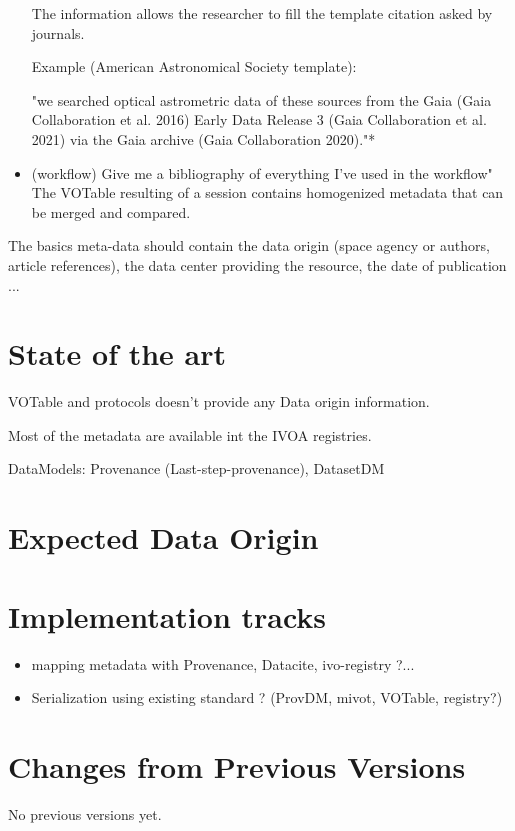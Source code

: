 \documentclass[11pt,a4paper]{ivoa}
\begin{document}
\begin{itemize}
	The information allows the researcher to fill the template citation asked by journals.
	
	Example (American Astronomical Society template):
	
	"we searched optical astrometric data of these sources from the Gaia (Gaia Collaboration et al. 2016) Early Data Release 3 (Gaia Collaboration et al. 2021) via the Gaia archive (Gaia Collaboration 2020)."*
	
	\item (workflow) Give me a bibliography of everything I've used in the workflow"
	The VOTable resulting of a session contains homogenized metadata that can be merged and compared.
	
\end{itemize}

The basics meta-data should contain the data origin (space agency or authors, article references), the data center providing the resource, the date of publication ...

\section{State of the art}
VOTable and protocols doesn't provide any Data origin information.

Most of the metadata are available int the IVOA registries.

DataModels:  Provenance (Last-step-provenance), DatasetDM 


\section{Expected Data Origin}

\section{Implementation tracks}

\begin{itemize}
\item mapping metadata with Provenance, Datacite, ivo-registry ?...
\item Serialization using existing standard ? (ProvDM, mivot, VOTable, registry?)
\end{itemize}

\appendix
\section{Changes from Previous Versions}

No previous versions yet.  






\end{document}
